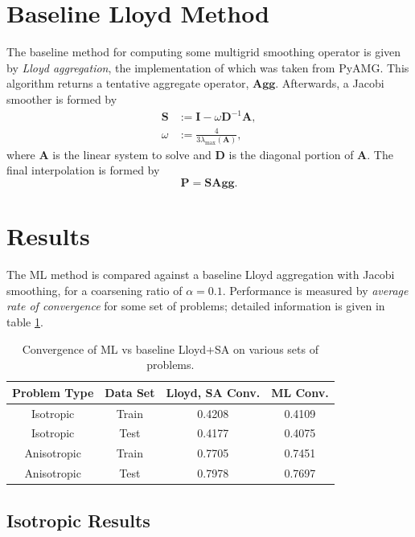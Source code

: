 \documentclass{article}
\newcommand{\mat}[1]{\bm{{#1}}}
\begin{document}
\section{Baseline Lloyd Method}
The baseline method for computing some multigrid smoothing operator is given by \textit{Lloyd aggregation}, the implementation of which was taken from PyAMG\cite{OlSc2018}.  This algorithm returns a tentative aggregate operator, $\mat{\text{Agg}}$.  Afterwards, a Jacobi smoother is formed by
\begin{align}
  \mat{S} &:= \mat{I} - \omega\mat{D}^{-1}\mat{A}, \\
  \omega &:= \frac{4}{3\lambda_{\max}\left(\mat{A}\right)},
\end{align}
where $\mat{A}$ is the linear system to solve and $\mat{D}$ is the diagonal portion of $\mat{A}$.  The final interpolation is formed by
\begin{equation}
  \mat{P} = \mat{S} \mat{\text{Agg}}.
\end{equation}

\section{Results}
The ML method is compared against a baseline Lloyd aggregation with Jacobi smoothing, for a coarsening ratio of $\alpha=0.1$.  Performance is measured by \textit{average rate of convergence} for some set of problems; detailed information is given in table \ref{tab:conv}.

\begin{table}[h]
  \centering
  \begin{tabular}{c c c c}
    \textbf{Problem Type} & \textbf{Data Set} & \textbf{Lloyd, SA Conv.} & \textbf{ML Conv.} \\
    \hline
    Isotropic & Train & 0.4208 & 0.4109 \\
    Isotropic & Test & 0.4177 & 0.4075 \\
    Anisotropic & Train & 0.7705 & 0.7451 \\
    Anisotropic & Test & 0.7978 & 0.7697 \\
    \hline
  \end{tabular}
  \caption{Convergence of ML vs baseline Lloyd+SA on various sets of problems.}
  \label{tab:conv}
\end{table}

\FloatBarrier
\subsection{Isotropic Results}
\end{document}
